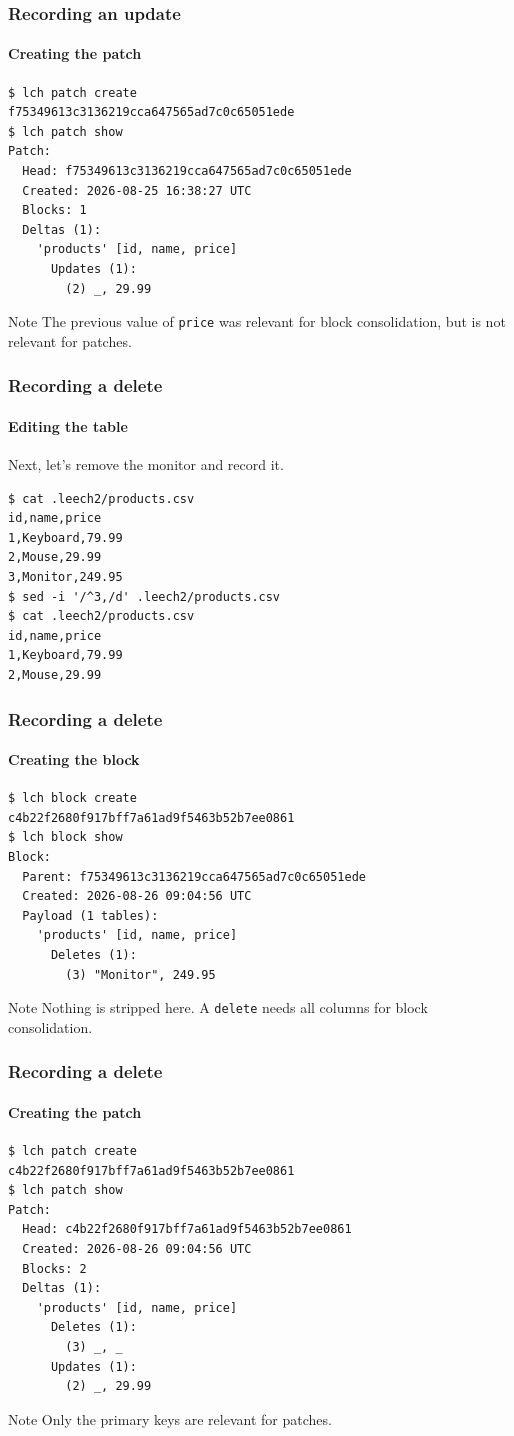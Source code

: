\documentclass{beamer}
\begin{document}
\begin{frame}[fragile]
\frametitle{Recording an update}
\framesubtitle{Creating the patch}
\begin{verbatim}
$ lch patch create
f75349613c3136219cca647565ad7c0c65051ede
$ lch patch show
Patch:
  Head: f75349613c3136219cca647565ad7c0c65051ede
  Created: 2026-08-25 16:38:27 UTC
  Blocks: 1
  Deltas (1):
    'products' [id, name, price]
      Updates (1):
        (2) _, 29.99
\end{verbatim}
\begin{block}{Note}
The previous value of \texttt{price} was relevant for block consolidation, but
is not relevant for patches.
\end{block}
\end{frame}


\begin{frame}[fragile]
\frametitle{Recording a delete}
\framesubtitle{Editing the table}
Next, let's remove the monitor and record it.
\begin{verbatim}
$ cat .leech2/products.csv
id,name,price
1,Keyboard,79.99
2,Mouse,29.99
3,Monitor,249.95
$ sed -i '/^3,/d' .leech2/products.csv
$ cat .leech2/products.csv
id,name,price
1,Keyboard,79.99
2,Mouse,29.99
\end{verbatim}
\end{frame}

\begin{frame}[fragile]
\frametitle{Recording a delete}
\framesubtitle{Creating the block}
\begin{verbatim}
$ lch block create
c4b22f2680f917bff7a61ad9f5463b52b7ee0861
$ lch block show
Block:
  Parent: f75349613c3136219cca647565ad7c0c65051ede
  Created: 2026-08-26 09:04:56 UTC
  Payload (1 tables):
    'products' [id, name, price]
      Deletes (1):
        (3) "Monitor", 249.95
\end{verbatim}
\begin{block}{Note}
Nothing is stripped here. A \texttt{delete} needs all columns for block
consolidation.
\end{block}
\end{frame}

\begin{frame}[fragile]
\frametitle{Recording a delete}
\framesubtitle{Creating the patch}
\begin{verbatim}
$ lch patch create
c4b22f2680f917bff7a61ad9f5463b52b7ee0861
$ lch patch show
Patch:
  Head: c4b22f2680f917bff7a61ad9f5463b52b7ee0861
  Created: 2026-08-26 09:04:56 UTC
  Blocks: 2
  Deltas (1):
    'products' [id, name, price]
      Deletes (1):
        (3) _, _
      Updates (1):
        (2) _, 29.99
\end{verbatim}
\begin{block}{Note}
Only the primary keys are relevant for patches.
\end{block}
\end{frame}
\end{document}
